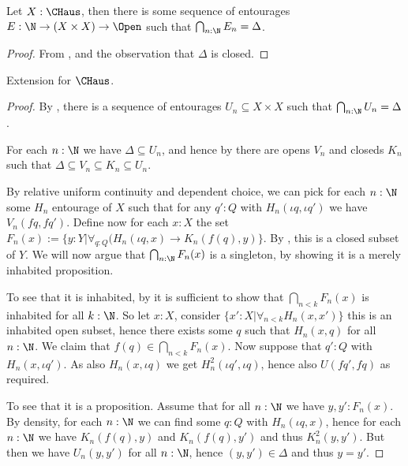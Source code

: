 \begin{lemma}\label{approxDeltaByOpens}
  Let $X:\CHaus$, then there is some sequence of entourages $E:\N \to (X \times X) \to \Open$ such that $\bigcap_{n:\N} E_n = \Delta$. 
\end{lemma}
\begin{proof}
From , and the observation that $\Delta$ is closed. 
\end{proof}

\begin{lemma}
  Extension for $\CHaus$. 
\end{lemma}
\begin{proof}
  By , there is a sequence of entourages $U_n\subseteq X \times X$ such that $\bigcap_{n:\N} U_n = \Delta$. 

  For each $n:\N$ we have $\Delta \subseteq U_n$, and hence by  there are opens $V_n$ and closeds $K_n$ such that $\Delta \subseteq V_n \subseteq K_n \subseteq U_n$. 

  By relative uniform continuity and dependent choice, we can pick for each $n:\N$ some $H_n$ entourage of $X$ such that for any $q':Q$ with $H_n(\iota q,\iota q')$ we have $V_n(f q , fq')$. 
  Define now for each $x:X$ the set $F_n(x) := \{y:Y | \forall_{q:Q} (H_n(\iota q , x) \to K_n(f(q),y)\}$. By , this is a closed subset of $Y$. 
  We will now argue that $\bigcap_{n:\N} F_n(x)$ is a singleton, by showing it is a merely inhabited proposition. 
\item To see that it is inhabited, by  it is sufficient to show that $\bigcap_{n<k} F_n(x)$ is inhabited for all $k:\N$. So let $x:X$, consider $\{x':X |\forall_{n<k} H_n(x,x')\}$ this is an inhabited open subset, hence there exists some $q$ such that $H_n(x,q)$ for all $n:\N$. We claim that $f(q)\in \bigcap_{n<k} F_n(x)$. 
  Now suppose that $q':Q$ with $H_n(x, \iota q')$. As also $H_n(x , \iota q)$ we get  $H_n^2(\iota q',\iota q)$, hence also $U(f q', fq)$ as required. 
\item To see that it is a proposition. Assume that for all $n:\N$ we have $y,y':F_n(x)$. By density, for each $n:\N$ we can find some $q:Q$ with $H_n(\iota q , x)$, hence for each $n:\N$ we have $K_n(f(q),y)$ and $K_n(f(q),y')$ and thus $K_n^2(y,y')$. 
  But then  we have $U_n(y,y')$ for all $n:\N$, hence $(y,y') \in \Delta$ and thus $y = y'$. 
\end{proof}
